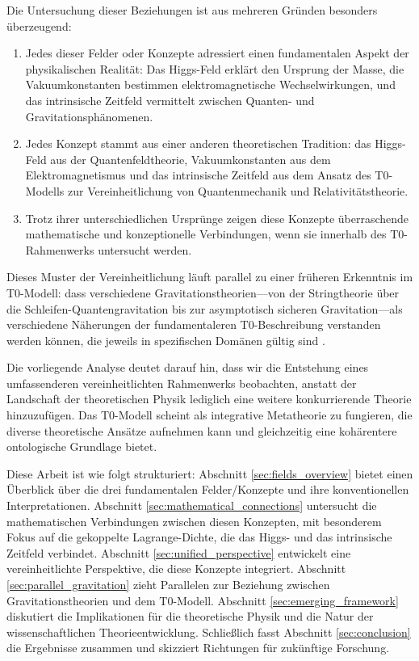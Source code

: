 \documentclass[12pt,a4paper]{article}
\begin{document}
	Die Untersuchung dieser Beziehungen ist aus mehreren Gründen besonders überzeugend:
	
	\begin{enumerate}
		\item Jedes dieser Felder oder Konzepte adressiert einen fundamentalen Aspekt der physikalischen Realität: Das Higgs-Feld erklärt den Ursprung der Masse, die Vakuumkonstanten bestimmen elektromagnetische Wechselwirkungen, und das intrinsische Zeitfeld vermittelt zwischen Quanten- und Gravitationsphänomenen.
		
		\item Jedes Konzept stammt aus einer anderen theoretischen Tradition: das Higgs-Feld aus der Quantenfeldtheorie, Vakuumkonstanten aus dem Elektromagnetismus und das intrinsische Zeitfeld aus dem Ansatz des T0-Modells zur Vereinheitlichung von Quantenmechanik und Relativitätstheorie.
		
		\item Trotz ihrer unterschiedlichen Ursprünge zeigen diese Konzepte überraschende mathematische und konzeptionelle Verbindungen, wenn sie innerhalb des T0-Rahmenwerks untersucht werden.
	\end{enumerate}
	
	Dieses Muster der Vereinheitlichung läuft parallel zu einer früheren Erkenntnis im T0-Modell: dass verschiedene Gravitationstheorien—von der Stringtheorie über die Schleifen-Quantengravitation bis zur asymptotisch sicheren Gravitation—als verschiedene Näherungen der fundamentaleren T0-Beschreibung verstanden werden können, die jeweils in spezifischen Domänen gültig sind \cite{pascher_completetheory_2025}.
	
	Die vorliegende Analyse deutet darauf hin, dass wir die Entstehung eines umfassenderen vereinheitlichten Rahmenwerks beobachten, anstatt der Landschaft der theoretischen Physik lediglich eine weitere konkurrierende Theorie hinzuzufügen. Das T0-Modell scheint als integrative Metatheorie zu fungieren, die diverse theoretische Ansätze aufnehmen kann und gleichzeitig eine kohärentere ontologische Grundlage bietet.
	
	Diese Arbeit ist wie folgt strukturiert: Abschnitt \ref{sec:fields_overview} bietet einen Überblick über die drei fundamentalen Felder/Konzepte und ihre konventionellen Interpretationen. Abschnitt \ref{sec:mathematical_connections} untersucht die mathematischen Verbindungen zwischen diesen Konzepten, mit besonderem Fokus auf die gekoppelte Lagrange-Dichte, die das Higgs- und das intrinsische Zeitfeld verbindet. Abschnitt \ref{sec:unified_perspective} entwickelt eine vereinheitlichte Perspektive, die diese Konzepte integriert. Abschnitt \ref{sec:parallel_gravitation} zieht Parallelen zur Beziehung zwischen Gravitationstheorien und dem T0-Modell. Abschnitt \ref{sec:emerging_framework} diskutiert die Implikationen für die theoretische Physik und die Natur der wissenschaftlichen Theorieentwicklung. Schließlich fasst Abschnitt \ref{sec:conclusion} die Ergebnisse zusammen und skizziert Richtungen für zukünftige Forschung.
	
\end{document}

